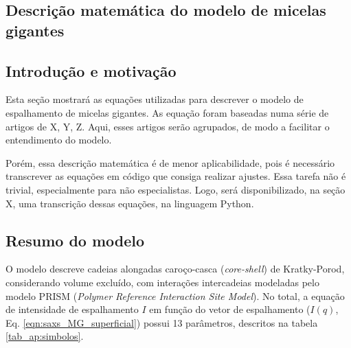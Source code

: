 
\begin{apendicesenv}
	\partapendices
	
	\chapter{Descrição matemática do modelo de micelas gigantes}
	
	\section{Introdução e motivação}
	
	Esta seção mostrará as equações utilizadas para descrever o modelo de espalhamento de micelas gigantes. As equação foram baseadas numa série de artigos de X, Y, Z. Aqui, esses artigos serão agrupados, de modo a facilitar o entendimento do modelo.
	
	Porém, essa descrição matemática é de menor aplicabilidade, pois é necessário transcrever as equações em código que consiga realizar ajustes. Essa tarefa não é trivial, especialmente para não especialistas. Logo, será disponibilizado, na seção X, uma transcrição dessas equações, na linguagem Python.

	
	\section{Resumo do modelo}
	
	O modelo descreve cadeias alongadas caroço-casca (\emph{core-shell}) de Kratky-Porod, considerando volume excluído, com interações intercadeias modeladas pelo modelo PRISM (\emph{Polymer Reference Interaction Site Model}). No total, a equação de intensidade de espalhamento $I$ em função do vetor de espalhamento \q ($I(q)$, Eq. \ref{eqn:saxs_MG_superficial}) possui 13 parâmetros, descritos na tabela \ref{tab_ap:simbolos}.
	

\end{apendicesenv}
